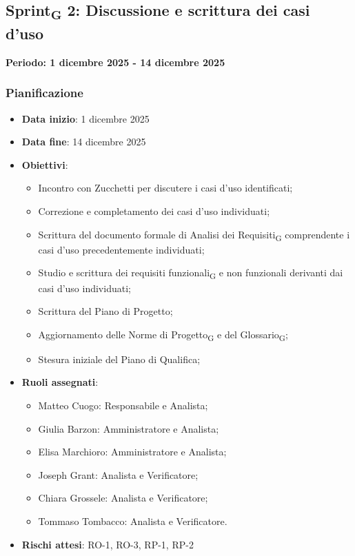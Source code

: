 \documentclass[11pt,a4paper]{article}
\newcommand{\gls}[1]{#1\textsubscript{G}}
\begin{document}
\newpage
\subsection{\gls{Sprint} 2: Discussione e scrittura dei casi d'uso}
{\textbf{Periodo: 1 dicembre 2025 - 14 dicembre 2025}\par}

\subsubsection{Pianificazione}
\begin{itemize}
    \item \textbf{Data inizio}: 1 dicembre 2025
    \item \textbf{Data fine}: 14 dicembre 2025
    \item \textbf{Obiettivi}:
    \begin{itemize}
        \item Incontro con Zucchetti per discutere i casi d'uso identificati;
        \item Correzione e completamento dei casi d'uso individuati;
        \item Scrittura del documento formale di \gls{Analisi dei Requisiti} comprendente i casi d'uso precedentemente individuati;
        \item Studio e scrittura dei \gls{requisiti funzionali} e non funzionali derivanti dai casi d'uso individuati;
        \item Scrittura del Piano di Progetto;
        \item Aggiornamento delle \gls{Norme di Progetto} e del \gls{Glossario};
        \item Stesura iniziale del Piano di Qualifica;
    \end{itemize}
    \item \textbf{Ruoli assegnati}:
    \begin{itemize}
        \item Matteo Cuogo: Responsabile e Analista;
        \item Giulia Barzon: Amministratore e Analista;
        \item Elisa Marchioro: Amministratore e Analista;
        \item Joseph Grant: Analista e Verificatore;
        \item Chiara Grossele: Analista e Verificatore;
        \item Tommaso Tombacco: Analista e Verificatore.
    \end{itemize}
    \item \textbf{Rischi attesi}: RO-1, RO-3, RP-1, RP-2
\end{itemize}
\end{document}
